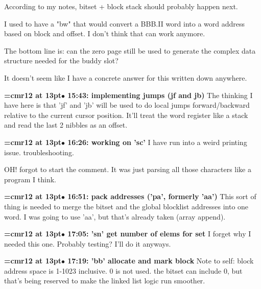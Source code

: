 According to my notes, bitset + block stack should probably happen next.
\par

I used to have a "bw" that would convert a BBB.II word into a word address based on block and offset. I don't think that can work anymore.
\par

The bottom line is: can the zero page still be used to generate the complex data structure needed for the buddy slot?
\par

It doesn't seem like I have a concrete answer for this written down anywhere.
\par

{\smallskip\noindent\bf\font\titlefont=cmr12 at 13pt\titlefont $\bullet$ 15:43: implementing jumps (jf and jb)}\smallskip
The thinking I have here is that 'jf' and 'jb' will be used to do local jumps forward/backward relative to the current cursor position. It'll treat the word register like a stack and read the last 2 nibbles as an offset.
\par

{\smallskip\noindent\bf\font\titlefont=cmr12 at 13pt\titlefont $\bullet$ 16:26: working on 'sc'}\smallskip
I have run into a weird printing issue. troubleshooting.
\par

OH! forgot to start the comment. It was just parsing all those characters like a program I think.
\par

{\smallskip\noindent\bf\font\titlefont=cmr12 at 13pt\titlefont $\bullet$ 16:51: pack addresses ('pa', formerly 'aa')}\smallskip
This sort of thing is needed to merge the bitset and the global blocklist addresses into one word. I was going to use 'aa', but that's already taken (array append).
\par

{\smallskip\noindent\bf\font\titlefont=cmr12 at 13pt\titlefont $\bullet$ 17:05: 'sn' get number of elems for set}\smallskip
I forget why I needed this one. Probably testing? I'll do it anyways.
\par

{\smallskip\noindent\bf\font\titlefont=cmr12 at 13pt\titlefont $\bullet$ 17:19: 'bb' allocate and mark block}\smallskip
Note to self: block address space is 1-1023 inclusive. 0 is not used. the bitset can include 0, but that's being reserved to make the linked list logic run smoother.
\par

